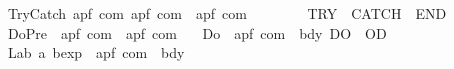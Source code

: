 \begin{isabellebody}
\isanewline
\ \ {\isachardoublequoteopen}{\isacharunderscore}Try{\isacharunderscore}Catch{\isachardoublequoteclose}{\isacharcolon}{\isacharcolon}\ {\isachardoublequoteopen}{\isacharparenleft}{\isacharprime}a{\isacharcomma}{\isacharprime}p{\isacharcomma}{\isacharprime}f{\isacharparenright}\ com\ {\isasymRightarrow}{\isacharparenleft}{\isacharprime}a{\isacharcomma}{\isacharprime}p{\isacharcomma}{\isacharprime}f{\isacharparenright}\ com\ {\isasymRightarrow}\ {\isacharparenleft}{\isacharprime}a{\isacharcomma}{\isacharprime}p{\isacharcomma}{\isacharprime}f{\isacharparenright}\ com{\isachardoublequoteclose}\isanewline
\ \ \ \ \ \ \ \ {\isacharparenleft}{\isachardoublequoteopen}{\isacharparenleft}{}TRY\ {\isacharparenleft}{\isacharunderscore}{\isacharparenright}{\isacharslash}\ {\isacharparenleft}{}CATCH\ {\isacharunderscore}{\isacharparenright}{\isacharslash}\ END{\isacharparenright}{\isachardoublequoteclose}\ \ {\isacharbrackleft}{}{\isacharcomma}{}{\isacharbrackright}\ {}{}{\isacharparenright}\isanewline
\isanewline
\ \ {\isachardoublequoteopen}{\isacharunderscore}DoPre{\isachardoublequoteclose}\ {\isacharcolon}{\isacharcolon}\ {\isachardoublequoteopen}{\isacharparenleft}{\isacharprime}a{\isacharcomma}{\isacharprime}p{\isacharcomma}{\isacharprime}f{\isacharparenright}\ com\ {\isasymRightarrow}\ {\isacharparenleft}{\isacharprime}a{\isacharcomma}{\isacharprime}p{\isacharcomma}{\isacharprime}f{\isacharparenright}\ com{\isachardoublequoteclose}\ \isanewline
\ \ {\isachardoublequoteopen}{\isacharunderscore}Do{\isachardoublequoteclose}\ {\isacharcolon}{\isacharcolon}\ {\isachardoublequoteopen}{\isacharparenleft}{\isacharprime}a{\isacharcomma}{\isacharprime}p{\isacharcomma}{\isacharprime}f{\isacharparenright}\ com\ {\isasymRightarrow}\ bdy{\isachardoublequoteclose}\ {\isacharparenleft}{\isachardoublequoteopen}{\isacharparenleft}{}DO{\isacharslash}\ {\isacharparenleft}{\isacharunderscore}{\isacharparenright}{\isacharparenright}\ {\isacharslash}OD{\isachardoublequoteclose}\ {\isacharbrackleft}{}{\isacharbrackright}\ {}{}{}{}{\isacharparenright}\isanewline
\ \ {\isachardoublequoteopen}{\isacharunderscore}Lab{\isachardoublequoteclose}{\isacharcolon}{\isacharcolon}\ {\isachardoublequoteopen}{\isacharprime}a\ bexp\ {\isasymRightarrow}\ {\isacharparenleft}{\isacharprime}a{\isacharcomma}{\isacharprime}p{\isacharcomma}{\isacharprime}f{\isacharparenright}\ com\ {\isasymRightarrow}\ bdy{\isachardoublequoteclose}\isanewline
\ \ \ \ \ \ \ \ \ \ \ \ {\isacharparenleft}{\isachardoublequoteopen}{\isacharunderscore}{\isasymbullet}{\isacharslash}{\isacharunderscore}{\isachardoublequoteclose}\ {\isacharbrackleft}{}{}{}{}{\isacharcomma}{}{}{\isacharbrackright}\ {}{}{\isacharparenright}\isanewline

\end{isabellebody}
